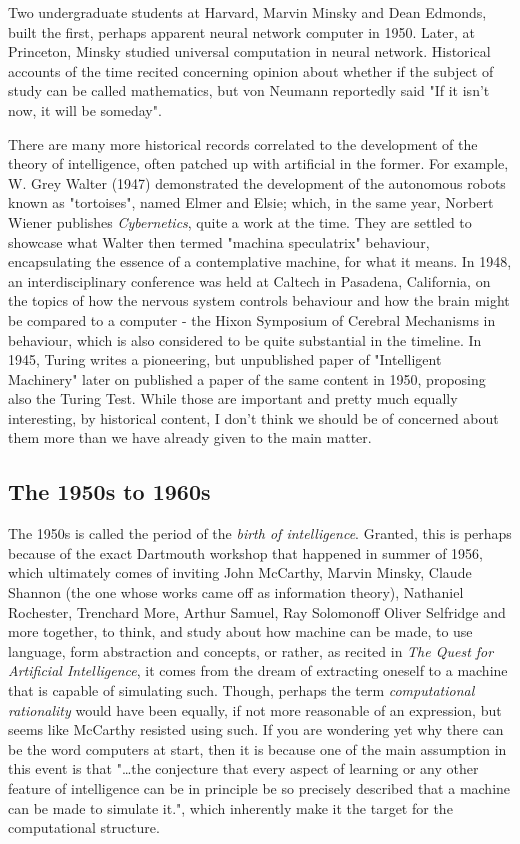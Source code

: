 Two undergraduate students at Harvard, Marvin Minsky and Dean Edmonds, built the first, perhaps apparent neural network computer in 1950. Later, at Princeton, Minsky studied universal computation in neural network. Historical accounts of the time recited concerning opinion about whether if the subject of study can be called mathematics, but von Neumann reportedly said "If it isn't now, it will be someday". 

There are many more historical records correlated to the development of the theory of intelligence, often patched up with artificial in the former. For example, W. Grey Walter (1947) demonstrated the development of the autonomous robots known as "tortoises", named Elmer and Elsie; which, in the same year, Norbert Wiener publishes \textit{Cybernetics}, quite a work at the time. They are settled to showcase what Walter then termed "machina speculatrix" behaviour, encapsulating the essence of a contemplative machine, for what it means. In 1948, an interdisciplinary conference was held at Caltech in Pasadena, California, on the topics of how the nervous system controls behaviour and how the brain might be compared to a computer - the Hixon Symposium of Cerebral Mechanisms in behaviour, which is also considered to be quite substantial in the timeline. In 1945, Turing writes a pioneering, but unpublished paper of "Intelligent Machinery" later on published a paper of the same content in 1950, proposing also the Turing Test. While those are important and pretty much equally interesting, by historical content, I don't think we should be of concerned about them more than we have already given to the main matter. 
\subsection{The 1950s to 1960s}

The 1950s is called the period of the \textit{birth of intelligence}. Granted, this is perhaps because of the exact Dartmouth workshop that happened in summer of 1956, which ultimately comes of inviting John McCarthy, Marvin Minsky, Claude Shannon (the one whose works came off as information theory), Nathaniel Rochester, Trenchard More, Arthur Samuel, Ray Solomonoff Oliver Selfridge and more together, to think, and study about how machine can be made, to use language, form abstraction and concepts, or rather, as recited in \textit{The Quest for Artificial Intelligence}, it comes from the dream of extracting oneself to a machine that is capable of simulating such. Though, perhaps the term \textit{computational rationality} would have been equally, if not more reasonable of an expression, but seems like McCarthy resisted using such. If you are wondering yet why there can be the word computers at start, then it is because one of the main assumption in this event is that "\dots the conjecture that every aspect of learning or any other feature of intelligence can be in principle be so precisely described that a machine can be made to simulate it.", which inherently make it the target for the computational structure. 

